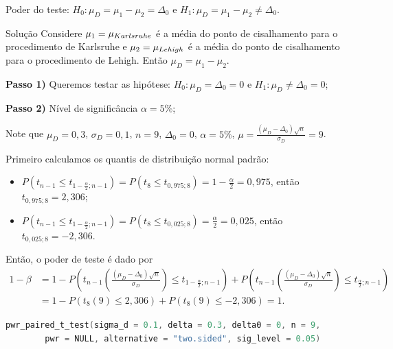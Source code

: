 \documentclass[9pt]{beamer}
\begin{document}
\begin{frame}[fragile]{Poder do teste: $H_0:\mu_D = \mu_1 - \mu_2 = \Delta_0$ e $H_1:\mu_D =  \mu_1 - \mu_2 \neq \Delta_0$.}

\footnotesize
\begin{block}{Solução}
	Considere $\mu_1=\mu_{\tiny Karlsruhe}$ é a média do ponto de cisalhamento para o procedimento de Karlsruhe e $\mu_2 = \mu_{\tiny Lehigh}$ é a média do ponto de cisalhamento para o procedimento de Lehigh. Então $\mu_D = \mu_1 - \mu_2$.
	
	\textbf{Passo 1)} Queremos testar as hipótese: $H_0: \mu_D = \Delta_0 = 0$ e $H_1: \mu_D \neq \Delta_0 = 0$;
	
	\textbf{Passo 2)} Nível de significância $\alpha=5\%$;
	
	Note que $\mu_D = 0,3$, $\sigma_D = 0,1$, $n=9$, $\Delta_0=0$, $\alpha=5\%$, $\mu =  \frac{( \mu_D - \Delta_0)\sqrt{n}}{\sigma_D} =9$.
	
	Primeiro calculamos os quantis de distribuição normal padrão:
	\begin{itemize}
		\item $P\left( t_{n-1} \leq t_{1-\frac{\alpha}{2}; n-1} \right) = P\left( t_{8} \leq t_{0,975; 8} \right) = 1-\frac{\alpha}{2} = 0,975$, então $t_{0,975; 8} = 2,306$;
		\item $P\left( t_{n-1} \leq t_{1-\frac{\alpha}{2}; n-1} \right) = P\left( t_{8} \leq t_{0,025; 8} \right) = \frac{\alpha}{2} = 0,025$, então $t_{0,025; 8} = -2,306$.
	\end{itemize}

	Então, o poder de teste é dado por
	\begin{align*}
	1-\beta &= 1 - P\left( t_{n-1}\left( \frac{(\mu_D - \Delta_0)\sqrt{n}}{\sigma_D} \right) \leq t_{1-\frac{\alpha}{2};n-1} \right) + P\left( t_{n-1}\left( \frac{(\mu_D - \Delta_0)\sqrt{n}}{\sigma_D} \right) \leq t_{\frac{\alpha}{2};n-1} \right)\\
	&= 1 - P \left( t_8 (9) \leq 2,306 \right) + P \left( t_8 (9) \leq -2,306 \right) =1.
	\end{align*}
\end{block}

\begin{lstlisting}[language = C, caption = Código no R.]
pwr_paired_t_test(sigma_d = 0.1, delta = 0.3, delta0 = 0, n = 9,
		pwr = NULL, alternative = "two.sided", sig_level = 0.05)
\end{lstlisting}

\normalsize

\end{frame}
\end{document}
